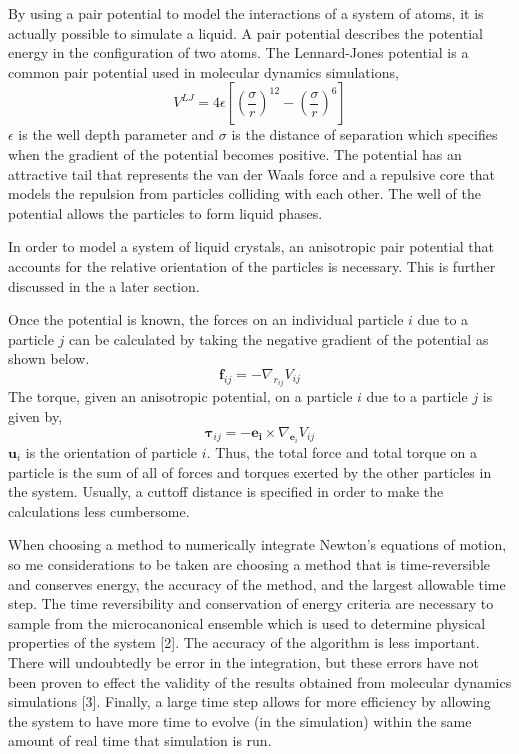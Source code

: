 \documentclass[preprint, aps]{revtex4-1}
\begin{document}
By using a pair potential to model the interactions of a system of atoms, it is 
actually possible to simulate a liquid. A pair potential describes the potential 
energy in the configuration of two atoms. The Lennard-Jones potential is a 
common pair potential used in molecular dynamics simulations,
	\begin{equation} \label{lennard-jones}
		V^{LJ}=4\epsilon
		\left[
		\left(\frac{\sigma}{r}\right)^{12}
		- \left(\frac{\sigma}{r}\right)^6
		\right]
	\end{equation}
$\epsilon$ is the well depth parameter and $\sigma$ is the distance of 
separation which specifies when the gradient of the potential becomes positive. 
The potential has an attractive tail that represents the van der Waals force and 
a repulsive core that models the repulsion from particles colliding with each
other. The well of the potential allows the particles to form liquid phases. 

In order to model a system of liquid crystals, an anisotropic pair 
potential that accounts for the relative orientation of the particles is 
necessary. This is further discussed in the a later section.
	
Once the potential is known, the forces on an individual particle $i$ due to a 
particle $j$ can be calculated by taking the negative gradient of the potential 
as shown below.
	\begin{equation} \label{force}
		\mathbf{f}_{ij}=-\nabla_{r_{ij}}V_{ij}
	\end{equation}
The torque, given an anisotropic potential, on a particle $i$ due to a particle 
$j$ is given by,
	\begin{equation} \label{torque}
		\boldsymbol{\tau}_{ij}=-\mathbf{e_i}\times\nabla_{\mathbf{e}_{i}}V_{ij}
	\end{equation}
$\mathbf{u}_{i}$ is the orientation of particle $i$. Thus, the total force and 
total torque on a particle is the sum of all of forces and torques exerted by 
the other particles in the system. Usually, a cuttoff distance is specified in 
order to make the calculations less cumbersome.
	
When choosing a method to numerically integrate Newton's equations of motion, so
me considerations to be taken are choosing a method that is time-reversible and 
conserves energy, the accuracy of the method, and the largest allowable time 
step. The time reversibility and conservation of energy criteria are necessary 
to sample from the microcanonical ensemble which is used to determine physical 
properties of the system [2]. The accuracy of the algorithm is less important. 
There will undoubtedly be error in the integration, but these errors have not 
been proven to effect the validity of the results obtained from molecular 
dynamics simulations [3]. Finally, a large time step allows for more efficiency 
by allowing the system to have more time to evolve (in the simulation) within 
the same amount of real time that simulation is run.
\end{document}
